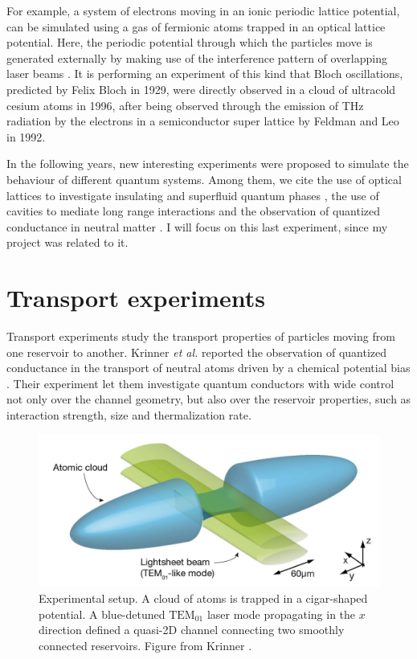 For example, a system of electrons moving in an ionic periodic lattice potential, can be simulated using a gas of fermionic atoms trapped in an optical lattice potential. Here, the periodic potential
through which the particles move is generated externally by making
use of the interference pattern of overlapping laser beams \cite{bloch2008}. It is performing an experiment of this kind that Bloch oscillations, predicted by Felix Bloch \cite{bloch1929a} in 1929, were directly observed in a cloud of ultracold cesium atoms \cite{dahan1996} in 1996, after being observed through the emission of THz radiation by the electrons in a semiconductor super lattice by Feldman and Leo \cite{feldmann1992} in 1992.

In the following years, new interesting experiments were proposed to simulate the behaviour of different quantum systems. Among them, we cite the use of optical lattices to investigate insulating and superfluid quantum phases \cite{greiner2002}, the use of cavities to mediate long range interactions \cite{landig2016} and the observation of quantized conductance in neutral matter \cite{krinner2015}. I will focus on this last experiment, since my project was related to it.

\section{Transport experiments}
Transport experiments study the transport properties of particles moving from one reservoir to another. Krinner \emph{et al.} reported the observation of quantized conductance in the transport of neutral atoms driven by a chemical potential bias \cite{krinner2015}. Their experiment let them investigate
quantum conductors with wide control not only over the channel
geometry, but also over the reservoir properties, such as interaction strength, size and thermalization rate.

\begin{figure}
    \includegraphics[width=\textwidth]{figures/reservoir.png}
    \caption{Experimental setup. A cloud of atoms is trapped in a cigar-shaped potential. A blue-detuned $\text{TEM}_{01}$ laser mode propagating in the $x$ direction defined a quasi-2D channel connecting two smoothly connected reservoirs. Figure from Krinner \cite{krinner2015}.}
    \label{fig:lithium_apparatus}
\end{figure}


